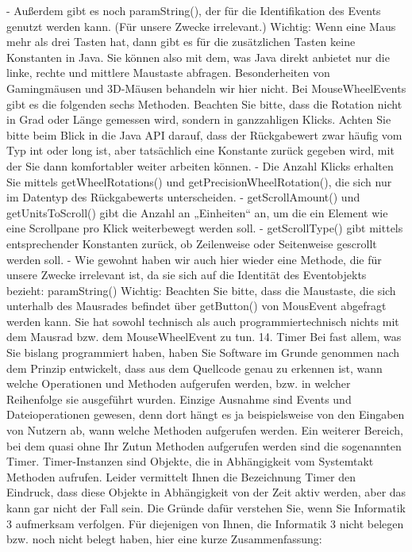 -	Außerdem gibt es noch paramString(), der für die Identifikation des Events genutzt werden kann. (Für unsere Zwecke irrelevant.)
Wichtig: Wenn eine Maus mehr als drei Tasten hat, dann gibt es für die zusätzlichen Tasten keine Konstanten in Java. Sie können also mit dem, was Java direkt anbietet nur die linke, rechte und mittlere Maustaste abfragen. Besonderheiten von Gamingmäusen und 3D-Mäusen behandeln wir hier nicht.
Bei MouseWheelEvents gibt es die folgenden sechs Methoden. Beachten Sie bitte, dass die Rotation nicht in Grad oder Länge gemessen wird, sondern in ganzzahligen Klicks. Achten Sie bitte beim Blick in die Java API darauf, dass der Rückgabewert zwar häufig vom Typ int oder long ist, aber tatsächlich eine Konstante zurück gegeben wird, mit der Sie dann komfortabler weiter arbeiten können.
-	Die Anzahl Klicks erhalten Sie mittels getWheelRotations() und getPrecisionWheelRotation(), die sich nur im Datentyp des Rückgabewerts unterscheiden.
-	getScrollAmount() und getUnitsToScroll() gibt die Anzahl an „Einheiten“ an, um die ein Element wie eine Scrollpane pro Klick weiterbewegt werden soll.
-	getScrollType() gibt mittels entsprechender Konstanten zurück, ob Zeilenweise oder Seitenweise gescrollt werden soll.
-	Wie gewohnt haben wir auch hier wieder eine Methode, die für unsere Zwecke irrelevant ist, da sie sich auf die Identität des Eventobjekts bezieht: paramString()
Wichtig: Beachten Sie bitte, dass die Maustaste, die sich unterhalb des Mausrades befindet über getButton() von MousEvent abgefragt werden kann. Sie hat sowohl technisch als auch programmiertechnisch nichts mit dem Mausrad bzw. dem MouseWheelEvent zu tun.
14.	Timer
Bei fast allem, was Sie bislang programmiert haben, haben Sie Software im Grunde genommen nach dem Prinzip entwickelt, dass aus dem Quellcode genau zu erkennen ist, wann welche Operationen und Methoden aufgerufen werden, bzw. in welcher Reihenfolge sie ausgeführt wurden. Einzige Ausnahme sind Events und Dateioperationen gewesen, denn dort hängt es ja beispielsweise von den Eingaben von Nutzern ab, wann welche Methoden aufgerufen werden.
Ein weiterer Bereich, bei dem quasi ohne Ihr Zutun Methoden aufgerufen werden sind die sogenannten Timer. Timer-Instanzen sind Objekte, die in Abhängigkeit vom Systemtakt Methoden aufrufen. Leider vermittelt Ihnen die Bezeichnung Timer den Eindruck, dass diese Objekte in Abhängigkeit von der Zeit aktiv werden, aber das kann gar nicht der Fall sein. Die Gründe dafür verstehen Sie, wenn Sie Informatik 3 aufmerksam verfolgen. Für diejenigen von Ihnen, die Informatik 3 nicht belegen bzw. noch nicht belegt haben, hier eine kurze Zusammenfassung:
